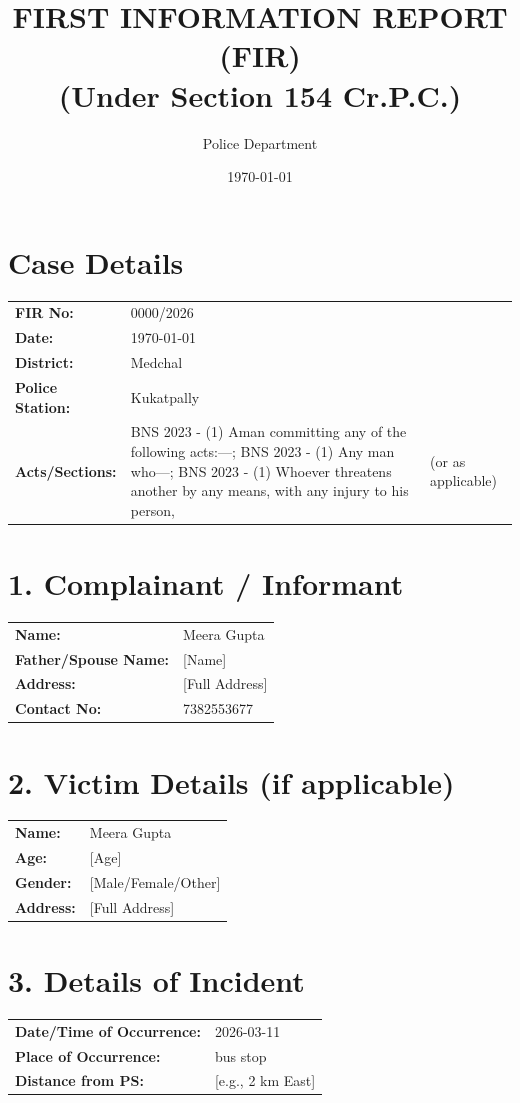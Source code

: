 \documentclass[11pt, a4paper]{article}
\title{\textbf{FIRST INFORMATION REPORT (FIR)}\\ \large (Under Section 154 Cr.P.C.)}
\author{Police Department}
\date{\today}
\begin{document}
\maketitle
\onehalfspacing

\section{Case Details}
\begin{tabular}{llp{8cm}}
  \textbf{FIR No:} & 0000/2026 & \\
  \textbf{Date:} & \today & \\
  \textbf{District:} & Medchal & \\
  \textbf{Police Station:} & Kukatpally & \\
  \textbf{Acts/Sections:} & BNS 2023 - (1) Aman committing any of the following acts:—; BNS 2023 - (1) Any man who—; BNS 2023 - (1) Whoever threatens another by any means, with any injury to his person, & (or as applicable) \\
\end{tabular}

\section{1. Complainant / Informant}
\begin{tabular}{ll}
  \textbf{Name:} & Meera Gupta \\
  \textbf{Father/Spouse Name:} & [Name] \\
  \textbf{Address:} & [Full Address] \\
  \textbf{Contact No:} & 7382553677 \\
\end{tabular}

\section{2. Victim Details (if applicable)}
\begin{tabular}{ll}
  \textbf{Name:} & Meera Gupta \\
  \textbf{Age:} & [Age] \\
  \textbf{Gender:} & [Male/Female/Other] \\
  \textbf{Address:} & [Full Address] \\
\end{tabular}

\section{3. Details of Incident}
\begin{tabular}{ll}
  \textbf{Date/Time of Occurrence:} & 2026-03-11 \\
  \textbf{Place of Occurrence:} & bus stop \\
  \textbf{Distance from PS:} & [e.g., 2 km East] \\
\end{tabular}
\end{document}
